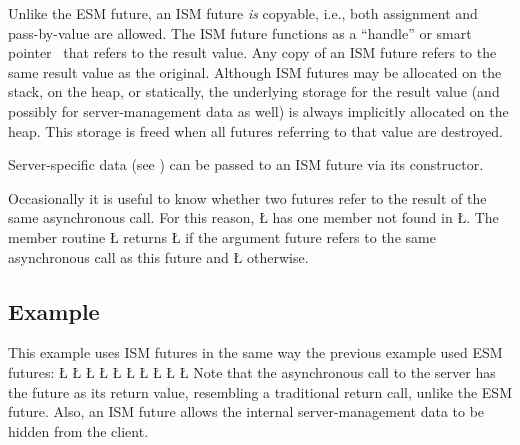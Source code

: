 \documentclass[openright,twoside]{report}
\begin{document}
Unlike the ESM future, an ISM future \emph{is} copyable, i.e., both assignment and pass-by-value are allowed.
The ISM future functions as a ``handle'' or smart pointer~\cite{Alexandrescu01} that refers to the result value.
Any copy of an ISM future refers to the same result value as the original.
Although ISM futures may be allocated on the stack, on the heap, or statically, the underlying storage for the result value (and possibly for server-management data as well) is always implicitly allocated on the heap.
This storage is freed when all futures referring to that value are destroyed.

Server-specific data (see ) can be passed to an ISM future via its constructor.

Occasionally it is useful to know whether two futures refer to the result of the same asynchronous call.
For this reason, \LGinlinetrue\LGbegin\lgrinde\L{}\endlgrinde\LGend{} has one member not found in \LGinlinetrue\LGbegin\lgrinde\L{}\endlgrinde\LGend{}.
The member routine \LGinlinetrue\LGbegin\lgrinde\L{}\endlgrinde\LGend{} returns \LGinlinetrue\LGbegin\lgrinde\L{}\endlgrinde\LGend{} if the argument future refers to the same asynchronous call as this future and \LGinlinetrue\LGbegin\lgrinde\L{}\endlgrinde\LGend{} otherwise.


\subsection{Example}

This example uses ISM futures in the same way the previous example used ESM futures:
\LGinlinefalse\LGbegin\lgrinde
\L{}
\CE{}\L{}
\CE{}\L{}
\CE{}\L{\LB{}}
\CE{}\L{\LB{\}}}
\L{}
\CE{}\L{}
\CE{}\L{\LB{}}
\CE{}\L{\LB{}}
\CE{}\L{\LB{\}}}
\endlgrinde\LGend
Note that the asynchronous call to the server has the future as its return value, resembling a traditional return call, unlike the ESM future.
Also, an ISM future allows the internal server-management data to be hidden from the client.
\end{document}
